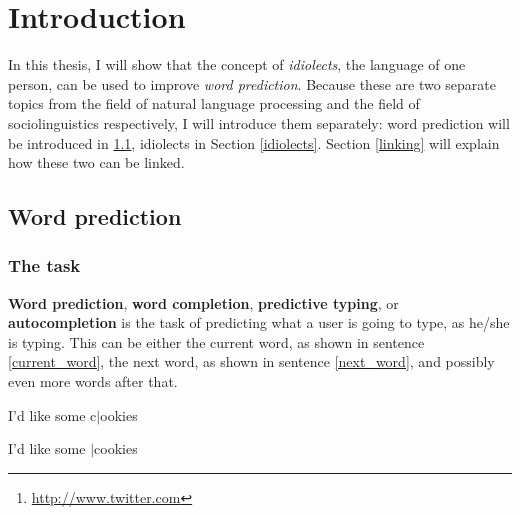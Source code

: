 \documentclass[11pt]{article}
\let\stdsection\section
\renewcommand\section{\newpage\stdsection}
\begin{document}
\begin{abstract}
To test this all on a much larger scale, I used Twitter\footnote{\url{http://www.twitter.com}}. During the spring of 2013, all tweets from a large group of Twitter users were (automatically) collected. For the 100 most active ones, Soothsayer then tried to predict the later tweets on the basis of earlier tweets. Most keystrokes could have been saved when using the idiolect model, with the recency buffer and the general language model in the background. 

Because Twitter also has information on which users talk to each other a lot, I also tried \emph{sociolect} models. These models are based on the tweets of a particular person \emph{and} the tweets of the people he/she often communicates with. The idea behind is that people who often communicate start to talk alike; in other words, the language of the friends of person $x$ can be helpful in trying to predict was person $x$ is going to say. This approach improved the results even further. For a number of users, more than 50\% of the keystrokes could have been saved if they had used Soothsayer. 
\end{abstract}

\section{Introduction} \label{intro}

In this thesis, I will show that the concept of \emph{idiolects}, the language of one person, can be used to improve \emph{word prediction}. Because these are two separate topics from the field of natural language processing and the field of sociolinguistics respectively, I will introduce them separately: word prediction will be introduced in \ref{word_prediction}, idiolects in Section \ref{idiolects}. Section \ref{linking} will explain how these two can be linked.

\subsection{Word prediction} \label{word_prediction}

\subsubsection{The task}

\textbf{Word prediction}, \textbf{word completion}, \textbf{predictive typing}, or \textbf{autocompletion} is the task of predicting what a user is going to type, as he/she is typing. This can be either the current word, as shown in sentence \ref{current_word}, the next word, as shown in sentence \ref{next_word}, and possibly even more words after that. 
\begin{examples}
\item I'd like some c$|$ookies \label{current_word}
\item I'd like some $|$cookies \label{next_word}
\end{examples}
\end{document}
